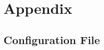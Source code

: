 %
\chapter{Appendix}
\label{sec:appendix}
%
%

\section{Configuration File} \label{app:config_yaml}

\clearpage
